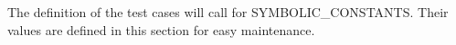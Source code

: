 \documentclass[12pt, titlepage]{article}
\begin{document}
The definition of the test cases will call for SYMBOLIC\_CONSTANTS. Their values are defined in this
section for easy maintenance.




\end{document}
